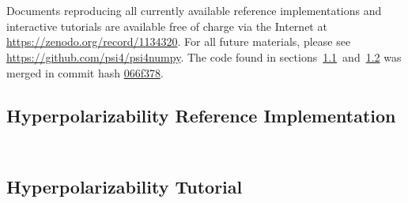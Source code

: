 \section{\texorpdfstring{}{Supporting Information}}

Documents reproducing all currently available reference implementations and interactive tutorials are available free of charge via the Internet at \url{https://zenodo.org/record/1134320}. For all future materials, please see \url{https://github.com/psi4/psi4numpy}. The code found in sections~\ref{paper_05:ssec:hyperpolarizability_reference_implementation}~and~\ref{paper_05:ssec:hyperpolarizability_tutorial} was merged in commit hash \href{https://github.com/psi4/psi4numpy/tree/066f378f26240a4802371ef32849230853581329}{066f378}.

\subsection{Hyperpolarizability Reference Implementation}
\label{paper_05:ssec:hyperpolarizability_reference_implementation}

\inputminted{python}{paper_05/helper_CPHF.py}
\inputminted{python}{paper_05/beta.py}

\subsection{Hyperpolarizability Tutorial}
\label{paper_05:ssec:hyperpolarizability_tutorial}

\providecommand{\tightlist}{%
  \setlength{\itemsep}{0pt}\setlength{\parskip}{0pt}}


